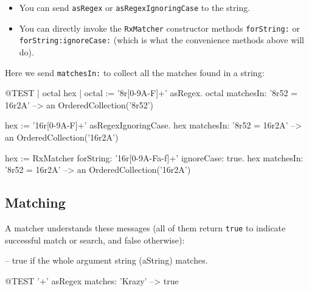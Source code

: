 \documentclass[10pt,twoside,chapterprefix=false]{scrbook}
\renewcommand{\ct}{\lstinline[mathescape=false,basicstyle={\sffamily\upshape}]}
\begin{document}
{\begin{itemize}
\item You can send \ct{asRegex} or \ct{asRegexIgnoringCase} to the string.

\item You can directly invoke the \ct{RxMatcher} constructor methods \ct{forString:} or \ct{forString:ignoreCase:} (which is what the convenience methods above will do).
%

\end{itemize}

Here we send \ct{matchesIn:} to collect all the matches found in a string:

\begin{ToSh-code}{@TEST | octal hex |}
octal := '8r[0-9A-F]+' asRegex.
octal matchesIn: '8r52 = 16r2A' --> an OrderedCollection('8r52')

hex := '16r[0-9A-F]+' asRegexIgnoringCase.
hex matchesIn: '8r52 = 16r2A'   --> an OrderedCollection('16r2A')

hex := RxMatcher forString: '16r[0-9A-Fa-f]+' ignoreCase: true.
hex matchesIn: '8r52 = 16r2A'   --> an OrderedCollection('16r2A')
\end{ToSh-code}

\subsection{Matching}

A matcher understands these messages (all of them return \ct{true} to indicate successful match or search, and false otherwise):

 -- true if the whole argument string (aString) matches.

\begin{ToSh-code}{@TEST}
'\w+' asRegex matches: 'Krazy' --> true
\end{ToSh-code}


}
\end{document}
